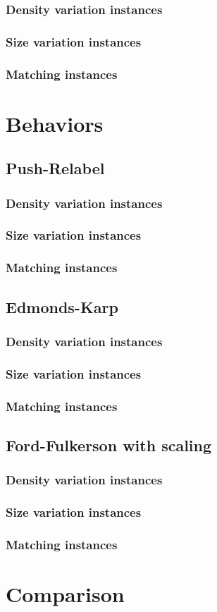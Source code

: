 \subsubsection{Density variation instances}
\subsubsection{Size variation instances}
\subsubsection{Matching instances}

\section{Behaviors}
\subsection{Push-Relabel}
\subsubsection{Density variation instances}
\subsubsection{Size variation instances}
\subsubsection{Matching instances}
\subsection{Edmonds-Karp}
\subsubsection{Density variation instances}
\subsubsection{Size variation instances}
\subsubsection{Matching instances}
\subsection{Ford-Fulkerson with scaling}
\subsubsection{Density variation instances}
\subsubsection{Size variation instances}
\subsubsection{Matching instances}

\section{Comparison}